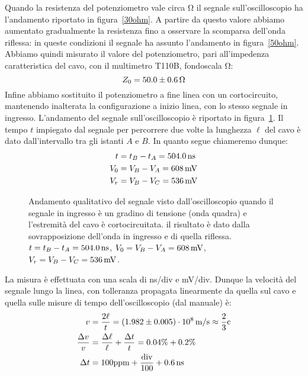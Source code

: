 \documentclass[italian,a4paper]{article}
\begin{document}
Quando la resistenza del potenziometro vale circa \unit[30]{\ohm} il segnale sull'oscilloscopio ha l'andamento riportato in figura~\ref{30ohm}. A partire da questo valore abbiamo aumentato gradualmente la resistenza fino a osservare la scomparsa dell'onda riflessa: in queste condizioni il segnale ha assunto l'andamento in figura~\ref{50ohm}. Abbiamo quindi misurato il valore del potenziometro, pari all'impedenza caratteristica del cavo, con il multimetro T110B, fondoscala \unit[200]{\ohm}:
\begin{equation*}
Z_0=\unit[50.0 \pm 0.6]{\ohm}
\end{equation*}
Infine abbiamo sostituito il potenziometro a fine linea con un cortocircuito, mantenendo inalterata la configurazione a inizio linea, con lo stesso segnale in ingresso. L'andamento del segnale sull'oscilloscopio è riportato in figura~\ref{corto}.
Il tempo $t$ impiegato dal segnale per percorrere due volte la lunghezza
$\ell$ del cavo è dato dall'intervallo tra gli istanti $A$ e $B$. In quanto
segue chiameremo dunque:
\begin{align*}
    t &= t_B - t_A = \unit[504.0]{ns}\\
    V_0 &= V_B - V_A = \unit[608]{mV}\\
    V_r &= V_B - V_C = \unit[536]{mV}
\end{align*}
  \begin{figure}[h]
     \caption{Andamento qualitativo del segnale visto dall'oscilloscopio quando il segnale in ingresso è un gradino di tensione (onda quadra) e l'estremità del cavo è cortocircuitata. il risultato è dato dalla sovrapposizione dell'onda in ingresso e di quella riflessa. $t = t_B - t_A = \unit[504.0]{ns}$, $V_0 = V_B - V_A =
\unit[608]{mV}$, $V_r = V_B - V_C = \unit[536]{mV}$.}
     \begin{center}
         
     \end{center}
     \label{corto}
 \end{figure}
La misura è effettuata con una scala di \unit[100]{ns}/div e
\unit[100]{mV/div}. Dunque la velocità del segnale lungo la linea, con
tolleranza  propagata linearmente da quella sul cavo e quella sulle
misure di tempo dell'oscilloscopio (dal manuale) è:
\begin{align*}
    v &=\dfrac{2\ell}{t}=\unit[(1.982 \pm 0.005) \cdot 10^8]{m/s} \approx
    \dfrac{2}{3} \text{c}    \\
    \dfrac{\Delta v}{v} &= \dfrac{\Delta \ell}{\ell} +
    \dfrac{\Delta t}{t} = 0.04\% + 0.2\%\\
    \Delta t &= 100\text{ppm} + \dfrac{\text{div}}{100} +
    \unit[0.6]{ns}
\end{align*}
\end{document}

